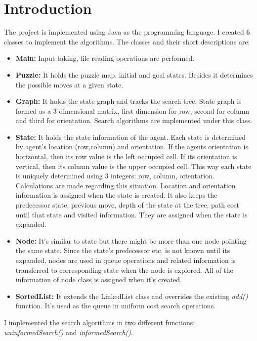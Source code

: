 \documentclass[12pt]{article}
\begin{document}
\section{Introduction}
The project is implemented using Java as the programming language. I created 6 classes to implement the algorithms. The classes and their short descriptions are:\\
\begin{itemize}
    \item \textbf{Main:} Input taking, file reading operations are performed.
    \item \textbf{Puzzle:} It holds the puzzle map, initial and goal states. Besides it determines the possible moves at a given state.
    \item \textbf{Graph:} It holds the state graph and tracks the search tree. State graph is formed as a 3 dimensional matrix, first dimension for row, second for column and third for orientation. Search algorithms are implemented under this class.
    \item \textbf{State:} It holds the state information of the agent. Each state is determined by agent's location (row,column) and orientation. If the agents orientation is horizontal, then its row value is the left occupied cell. If its orientation is vertical, then its column value is the upper occupied cell. This way each state is uniquely determined using 3 integers: row, column, orientation. Calculations are made regarding this situation. Location and orientation information is assigned when the state is created. It also keeps the predecessor state, previous move, depth of the state at the tree, path cost until that state and visited information. They are assigned when the state is expanded.
    \item \textbf{Node:} It's similar to state but there might be more than one node pointing the same state. Since the state's predecessor etc. is not known until its expanded, nodes are used in queue operations and related information is transferred to corresponding state when the node is explored. All of the information of node class is assigned when it's created.
    \item \textbf{SortedList:} It extends the LinkedList class and overrides the existing \textit{add()} function. It's used as the queue in uniform cost search operations.
\end{itemize}

I implemented the search algorithms in two different functions: \textit{uninformedSearch()} and \textit{informedSearch()}.\\
\end{document}
